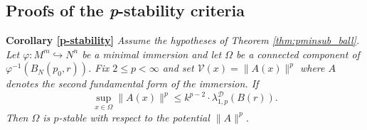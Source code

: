 \documentclass{article}
\begin{document}
\subsection{Proofs of the \textit{p}-stability criteria}
\textbf{Corollary \ref{p-stability}} \textit{Assume the hypotheses of Theorem \ref{thm:pminsub_ball}.
Let $\varphi : M^m \hookrightarrow N^n$ be a minimal immersion and let 
$\Omega$ be a connected component of 
$\varphi^{-1}(B_N(p_0,r))$.
Fix $2 \leq p < \infty$ and set $\mathcal V(x) = \|A(x)\|^p$ where $A$ denotes the second fundamental form of the immersion. If
\begin{equation}\label{p-st}
\sup_{x \in \Omega} \|A(x)\|^p \leq k^{p-2} \cdot \lambda_{1,p}^{\mathcal D}(B(r)).
\end{equation}
Then $\Omega$ is $p$-stable with respect to the potential $\|A\|^p$.}
\end{document}
